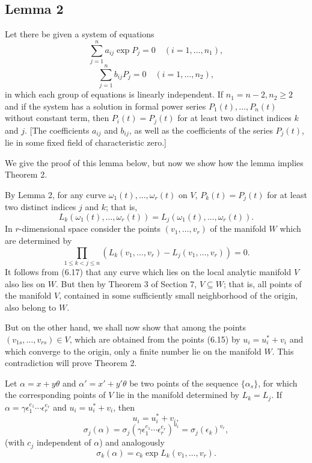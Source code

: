 \documentclass{article}
\begin{document}
\subsection*{Lemma 2}
Let there be given a system of equations
\begin{equation}
\sum_{j=1}^n a_{ij} \exp P_j = 0 \quad (i = 1, \ldots, n_1),
\end{equation}
\begin{equation}
\sum_{j=1}^n b_{ij} P_j = 0 \quad (i = 1, \ldots, n_2),
\end{equation}
in which each group of equations is linearly independent. If $n_1 = n - 2, n_2 \geq 2$ 
and if the system has a solution in formal power series $P_1(t), \ldots, P_n(t)$ without 
constant term, then $P_i(t) = P_j(t)$ for at least two distinct indices $k$ and $j$. 
[The coefficients $a_{ij}$ and $b_{ij}$, as well as the coefficients of the series 
$P_j(t)$, lie in some fixed field of characteristic zero.]

We give the proof of this lemma below, but now we show how the lemma implies Theorem 2.

By Lemma 2, for any curve $\omega_1(t), \ldots, \omega_r(t)$ on $V$, $P_k(t) = P_j(t)$ 
for at least two distinct indices $j$ and $k$; that is,
\begin{equation}
L_k(\omega_1(t), \ldots, \omega_r(t)) = L_j(\omega_1(t), \ldots, \omega_r(t)).
\end{equation}
In $r$-dimensional space consider the points $(v_1, \ldots, v_r)$ of the manifold $W$ 
which are determined by
\begin{equation}
\prod_{1 \leq k < j \leq n} (L_k(v_1, \ldots, v_r) - L_j(v_1, \ldots, v_r)) = 0.
\end{equation}
It follows from (6.17) that any curve which lies on the local analytic manifold $V$ 
also lies on $W$. But then by Theorem 3 of Section 7, $V \subseteq W$; that is, all 
points of the manifold $V$, contained in some sufficiently small neighborhood of the origin, 
also belong to $W$.

But on the other hand, we shall now show that among the points $(v_{1s}, \ldots, v_{rs}) \in V$, 
which are obtained from the points (6.15) by $u_i = u_i^* + v_i$ and which converge to the origin, 
only a finite number lie on the manifold $W$. This contradiction will prove Theorem 2.

Let $\alpha = x + y \theta$ and $\alpha' = x' + y' \theta$ be two points of the sequence 
$\{\alpha_s\}$, for which the corresponding points of $V$ lie in the manifold determined by 
$L_k = L_j$. If $\alpha = \gamma \epsilon_1^{e_1} \cdots \epsilon_r^{e_r}$ and $u_i = u_i^* + v_i$, then
\begin{equation}
u_i = u_i^* + v_i,
\end{equation}
\begin{equation}
\sigma_j(\alpha) = \sigma_j(\gamma \epsilon_1^{e_1} \cdots \epsilon_r^{e_r})^{u_i} = \sigma_j(\epsilon_k)^{v_r},
\end{equation}
(with $c_j$ independent of $\alpha$) and analogously
\begin{equation}
\sigma_k(\alpha) = c_k \exp L_k(v_1, \ldots, v_r).
\end{equation}
\end{document}
